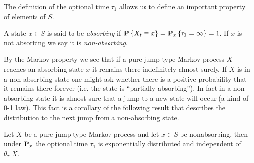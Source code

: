 The definition of the optional time $\tau_1$ allows us to define an
important property of elements of $S$.
\begin{defn}A state $x \in S$ is said to be \emph{absorbing} if
  $\probability{X_t \equiv x} = \sprobability{\tau_1 = \infty}{x} =
  1$.  If $x$ is not absorbing we say it is \emph{non-absorbing}.
\end{defn}
By the Markov property we see that if a pure jump-type Markov process
$X$ reaches an absorbing state $x$ it remains there indefinitely
almost surely.  If $X$ is in a non-absorbing state one might ask
whether there is a positive probability that it remains there forever
(i.e. the state is ``partially absorbing'').  In fact in a
non-absorbing state it is almost sure that a jump to a new state will
occur (a kind of 0-1 law).  This fact is a corollary of the following
result that describes the distribution to the next jump from a
non-absorbing state.
\begin{lem}\label{PureJumpFirstJumpTime}Let $X$ be a pure jump-type Markov process and let $x \in
  S$ be nonabsorbing, then under $\probabilityop_x$ the optional time
  $\tau_1$ is exponentially distributed and independent of $\theta_{\tau_1}X$.
\end{lem}
